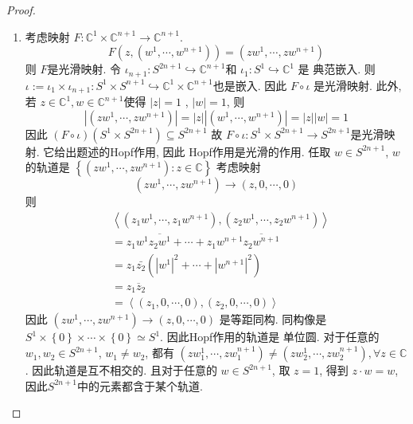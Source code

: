\documentclass[../main.tex]{subfiles}
\begin{document}
\begin{proof}
\begin{enumerate}
        \item [c).] 考虑映射 \(  F: \mathbb{C} ^{1}\times \mathbb{C} ^{n+ 1}\to \mathbb{C} ^{n+ 1}  \). \[
        F\left( z,\left( w^{1},\cdots ,w^{n+ 1} \right)  \right)= \left( zw^{1},\cdots ,zw^{n+ 1} \right)  
        \]  则 \(  F  \)是光滑映射. 令 \(  \iota_{n+ 1} : S^{2n+ 1}\hookrightarrow \mathbb{C} ^{n+ 1}  \)和 \(  \iota _{1}:S^{1}\hookrightarrow \mathbb{C} ^{1}  \) 是 典范嵌入.  则 \( \iota :=  \iota _{1}\times \iota _{n+ 1}: S^{1}\times S^{n+ 1}\hookrightarrow \mathbb{C} ^{1}\times \mathbb{C} ^{n+ 1}  \)也是嵌入. 因此 \(  F\circ \iota   \) 是光滑映射. 此外, 若 \(  z\in \mathbb{C} ^{1}, w\in \mathbb{C} ^{n+ 1}  \)使得 \(  \left| z \right|= 1   \) , \(  \left| w \right|= 1   \), 则 \[
        \left| \left( zw^{1},\cdots ,zw^{n+ 1} \right)  \right|= \left| z \right|\left| \left( w^{1},\cdots ,w^{n+ 1} \right)  \right|=\left| z \right|\left| w \right|=    1  
        \]   因此 \(  \left( F\circ \iota  \right)\left( S^{1}\times S^{2n+ 1} \right)\subseteq S^{2n+ 1}    \) 故 \(  F\circ \iota : S^{1}\times S^{2n+ 1}\to S^{2n+ 1}  \)是光滑映射. 它给出题述的Hopf作用, 因此 Hopf作用是光滑的作用. 任取 \(  w\in S^{2n+ 1}  \), \(  w  \)的轨道是 \(  \left\{ \left( zw^{1},\cdots ,z w^{n+ 1} \right): z \in \mathbb{C}   \right\}  \)    考虑映射 \[
        \left( zw^{1},\cdots ,zw^{n+ 1} \right)\to \left( z,0,\cdots ,0 \right)  
        \] 则 \[
        \begin{aligned}
      & \left<\left( z_1 w^{1},\cdots ,z_1w^{n+ 1} \right),\left( z_2w^{1},\cdots ,z_2 w^{n+ 1} \right)   \right> \\ 
       &= z_1w^{1} \overline{z_2w^{1}}+ \cdots +  z_1w^{n+ 1}\overline{z_2w^{n+ 1}}\\ 
        &= z_1 \bar{z_2} \left( \left| w^{1} \right|^{2}+ \cdots + \left| w^{n+ 1} \right|^{2}   \right)\\ 
         &= z_1  \overline{z}_{2} \\ 
          &= \left<\left( z_1,0,\cdots ,0 \right), \left( z_2,0,\cdots ,0 \right)   \right>
        \end{aligned}
        \]因此 \(  \left( zw^{1},\cdots ,z w^{n+ 1} \right)\to \left( z,0,\cdots ,0 \right)    \) 是等距同构. 同构像是 \(  S^{1}\times \left\{ 0 \right\}\times \cdots \times \left\{ 0 \right\}\simeq S^{1}  \). 因此Hopf作用的轨道是 单位圆. 对于任意的 \(  w_1,w_2\in  S^{2n+ 1}  \), \(  w_1\neq w_2  \), 都有 \(  \left( zw_1^{1},\cdots ,zw_1^{n+ 1} \right) \neq \left( zw_2^{1},\cdots ,zw_2^{n+ 1} \right) , \forall z\in \mathbb{C}   \).    因此轨道是互不相交的.  且对于任意的 \(  w\in S^{2n+ 1}  \), 取 \(  z= 1  \), 得到 \(  z\cdot w= w  \), 因此\(  S^{2n+ 1}  \)中的元素都含于某个轨道.    
    \end{enumerate}
    
\end{proof}
\end{document}
